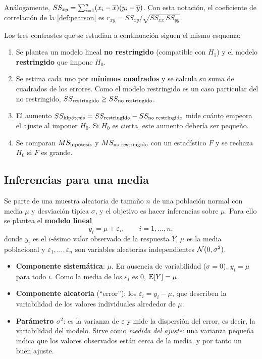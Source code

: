 \begin{nota}
  Análogamente, $SS_{xy}=\sum_{i=1}^{n}(x_i-\overline{x})(y_i-\overline{y})$. Con esta notación, el
  coeficiente de correlación de la \cref{def:pearson} es
  $r_{xy} = SS_{xy}/\sqrt{SS_{xx}\,SS_{yy}}$.
\end{nota}

Los tres contrastes que se estudian a continuación siguen el mismo esquema:
\begin{resumen}
  \begin{enumerate}
    \item Se plantea un modelo lineal \textbf{no restringido} (compatible con $H_1$) y el modelo
      \textbf{restringido} que impone $H_0$.
    \item Se estima cada uno por \textbf{mínimos cuadrados} y se calcula su suma de cuadrados
      de los errores. Como el modelo restringido es un caso particular del no restringido,
      $SS_{\text{restringido}} \ge SS_{\text{no restringido}}$.
    \item El aumento $SS_{\text{hipótesis}}=SS_{\text{restringido}}-SS_{\text{no restringido}}$ mide cuánto empeora
      el ajuste al imponer $H_0$. Si $H_0$ es cierta, este aumento debería ser pequeño.
    \item Se comparan $MS_{\text{hipótesis}}$ y $MS_{\text{no restringido}}$ con un estadístico $F$ y se
      rechaza $H_0$ si $F$ es grande.
  \end{enumerate}
\end{resumen}

\subsection{Inferencias para una media}
\label{sec:t1-una-media}

Se parte de una muestra aleatoria de tamaño $n$ de una población normal con media $\mu$ y
desviación típica $\sigma$, y el objetivo es hacer inferencias sobre $\mu$. Para ello se
plantea el \textbf{modelo lineal}
\[
  y_i = \mu + \varepsilon_i, \qquad i=1,\ldots,n,
\]
donde $y_i$ es el $i$-ésimo valor observado de la respuesta $Y$, $\mu$ es la media poblacional
y $\varepsilon_1,\ldots,\varepsilon_n$ son variables aleatorias independientes
$\mathcal{N}(0,\sigma^2)$.
\begin{itemize}
  \item \textbf{Componente sistemática}: $\mu$. En ausencia de variabilidad ($\sigma=0$),
    $y_i=\mu$ para todo $i$. Como la media de los $\varepsilon_i$ es 0, $\operatorname{E}[Y]=\mu$.
  \item \textbf{Componente aleatoria} (``error''): los $\varepsilon_i=y_i-\mu$, que describen la
    variabilidad de los valores individuales alrededor de $\mu$.
  \item \textbf{Parámetro $\sigma^2$}: es la varianza de $\varepsilon$ y mide la dispersión del
    error, es decir, la variabilidad del modelo. Sirve como \emph{medida del ajuste}: una
    varianza pequeña indica que los valores observados están cerca de la media, y por tanto
    un buen ajuste.
\end{itemize}

